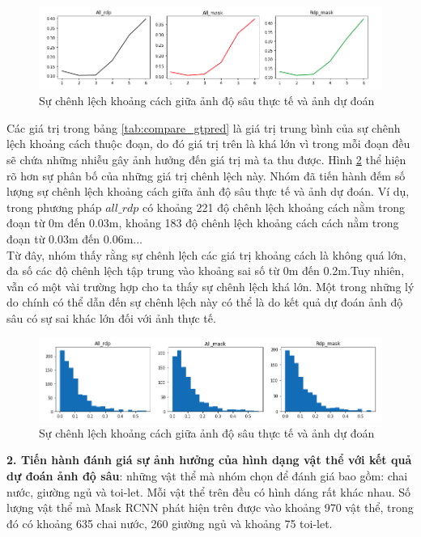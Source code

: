 \begin{center}
   \begin{figure}[H]
   \begin{center}
   \includegraphics[scale=0.55]{image/deviation}
   \end{center}
   \caption{Sự chênh lệch khoảng cách giữa ảnh độ sâu thực tế và ảnh dự đoán}
   \label{fig:deviation}
   \end{figure}
 \end{center}
 
 Các giá trị trong bảng \ref{tab:compare_gtpred} là giá trị trung bình của sự chênh lệch khoảng cách thuộc đoạn, do đó giá trị trên là khá lớn vì trong mỗi đoạn đều sẽ chứa những nhiễu gây ảnh hưởng đến giá trị mà ta thu được. Hình \ref{fig:distribution} thể hiện rõ hơn sự phân bố của những giá trị chênh lệch này. Nhóm đã tiến hành đếm số lượng sự chênh lệch khoảng cách giữa ảnh độ sâu thực tế và ảnh dự đoán.  Ví dụ, trong phương pháp $all\_rdp$ có khoảng 221 độ chênh lệch khoảng cách nằm trong đoạn từ 0m đến 0.03m, khoảng 183 độ chênh lệch khoảng cách cách nằm trong đoạn từ 0.03m đến 0.06m... \\
 
 Từ đây, nhóm thấy rằng sự chênh lệch các giá trị khoảng cách là không quá lớn, đa số các độ chênh lệch tập trung vào khoảng sai số từ 0m đến 0.2m.Tuy nhiên, vẫn có một vài trường hợp cho ta thấy sự chênh lệch khá lớn. Một trong những lý do chính có thể dẫn đến sự chênh lệch này có thể là do kết quả dự đoán ảnh độ sâu có sự sai khác lớn đối với ảnh thực tế.
 \begin{center}
   \begin{figure}[H]
   \begin{center}
   \includegraphics[scale=0.55]{image/distribution}
   \end{center}
   \caption{Sự chênh lệch khoảng cách giữa ảnh độ sâu thực tế và ảnh dự đoán}
   \label{fig:distribution}
   \end{figure}
 \end{center} 
 \hspace{.2cm}\textbf{2. Tiến hành đánh giá sự ảnh hưởng của hình dạng vật thể với kết quả dự đoán ảnh độ sâu}: những vật thể mà nhóm chọn để đánh giá bao gồm: chai nước, giường ngủ và toi-let. Mỗi vật thể trên đều có hình dáng rất khác nhau. Số lượng vật thể mà Mask RCNN phát hiện trên được vào khoảng 970 vật thể, trong đó có khoảng 635 chai nước, 260 giường ngủ và khoảng 75 toi-let. \\
 
